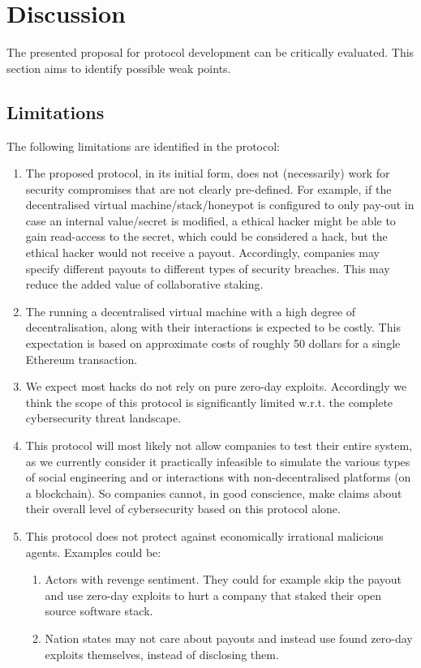 \section{Discussion}
\label{sec:discussion}
The presented proposal for protocol development can be critically evaluated. This section aims to identify possible weak points.
\subsection{Limitations}
The following limitations are identified in the protocol:
\begin{enumerate}
    \item The proposed protocol, in its initial form, does not (necessarily) work for security compromises that are not clearly pre-defined. For example, if the decentralised virtual machine/stack/honeypot is configured to only pay-out in case an internal value/secret is modified, a ethical hacker might be able to gain read-access to the secret, which could be considered a hack, but the ethical hacker would not receive a payout. Accordingly, companies may specify different payouts to different types of security breaches. This may reduce the added value of collaborative staking.
    \item The running a decentralised virtual machine with a high degree of decentralisation, along with their interactions is expected to be costly. This expectation is based on approximate costs of roughly 50 dollars for a single Ethereum transaction.
    \item We expect most hacks do not rely on pure zero-day exploits. Accordingly we think the scope of this protocol is significantly limited w.r.t. the complete cybersecurity threat landscape.
    \item This protocol will most likely not allow companies to test their entire system, as we currently consider it practically infeasible to simulate the various types of social engineering and or interactions with non-decentralised platforms (on a blockchain). So companies cannot, in good conscience, make claims about their overall level of cybersecurity based on this protocol alone.
    \item This protocol does not protect against economically irrational malicious agents. Examples could be:
    \begin{enumerate}
        \item Actors with revenge sentiment. They could for example skip the payout and use zero-day exploits to hurt a company that staked their open source software stack.
        \item Nation states may not care about payouts and instead use found zero-day exploits themselves, instead of disclosing them.
    \end{enumerate}
\end{enumerate}

